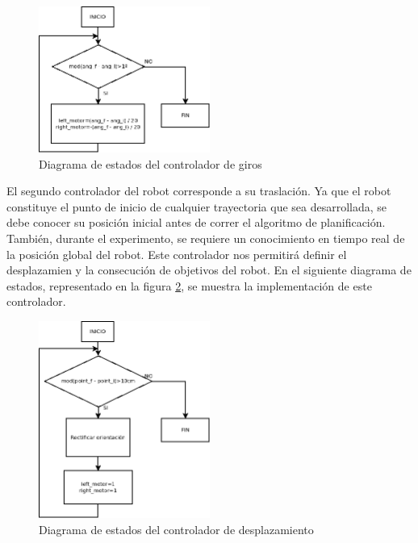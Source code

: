 \begin{figure}[H]
		\centering
        \includegraphics[width=0.5\textwidth]{images/flujogiro.png}
        \caption{Diagrama de estados del controlador de giros}
        \label{fig:flujogiro}
\end{figure} 

El segundo controlador del robot corresponde a su traslación. Ya que el robot constituye el punto de inicio de cualquier trayectoria que sea desarrollada, se debe conocer su posición inicial antes de correr el algoritmo de planificación. También, durante el experimento, se requiere un conocimiento en tiempo real de la posición global del robot. Este controlador nos permitirá definir el desplazamien y la consecución de objetivos del robot. En el siguiente diagrama de estados, representado en la figura \ref{fig:flujoavance}, se muestra la implementación de este controlador.

\begin{figure}[H]
		\centering
        \includegraphics[width=0.5\textwidth]{images/flujoavance.png}
        \caption{Diagrama de estados del controlador de desplazamiento}
        \label{fig:flujoavance}
\end{figure}


